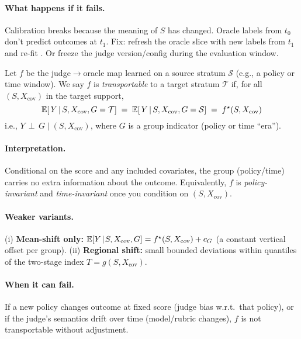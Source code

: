 \paragraph{What happens if it fails.} Calibration breaks because the meaning of $S$ has changed. Oracle labels from $t_0$ don't predict outcomes at $t_1$. Fix: refresh the oracle slice with new labels from $t_1$ and re-fit \autocal. Or freeze the judge version/config during the evaluation window.

\begin{assumption}
\label{assum:transport}
Let $f$ be the judge$\to$oracle map learned on a source stratum $\mathcal{S}$ (e.g., a policy or time window).
We say $f$ is \emph{transportable} to a target stratum $\mathcal{T}$ if, for all $(S, X_{\mathrm{cov}})$ in the target support,
\[
\operatorname{\mathbb{E}}\!\left[\,Y \,\middle|\, S, X_{\mathrm{cov}}, G=\mathcal{T}\right]
\;=\;
\operatorname{\mathbb{E}}\!\left[\,Y \,\middle|\, S, X_{\mathrm{cov}}, G=\mathcal{S}\right]
\;=\; f^\star(S, X_{\mathrm{cov}})
\]
i.e., $Y \,\perp\, G \mid (S, X_{\mathrm{cov}})$, where $G$ is a group indicator (policy or time ``era'').
\end{assumption}

\paragraph{Interpretation.} Conditional on the score and any included covariates, the group (policy/time) carries no extra information about the outcome. Equivalently, $f$ is \emph{policy-invariant} and \emph{time-invariant} once you condition on $(S, X_{\mathrm{cov}})$.

\paragraph{Weaker variants.}
(i) \textbf{Mean-shift only:} $\operatorname{\mathbb{E}}[Y\!\mid\!S,X_{\mathrm{cov}},G] = f^\star(S,X_{\mathrm{cov}}) + c_G$
(a constant vertical offset per group).
(ii) \textbf{Regional shift:} small bounded deviations within quantiles of the two-stage index $T=g(S,X_{\mathrm{cov}})$.

\paragraph{When it can fail.} If a new policy changes outcome at fixed score (judge bias w.r.t.\ that policy), or if the judge's semantics drift over time (model/rubric changes), $f$ is not transportable without adjustment.

